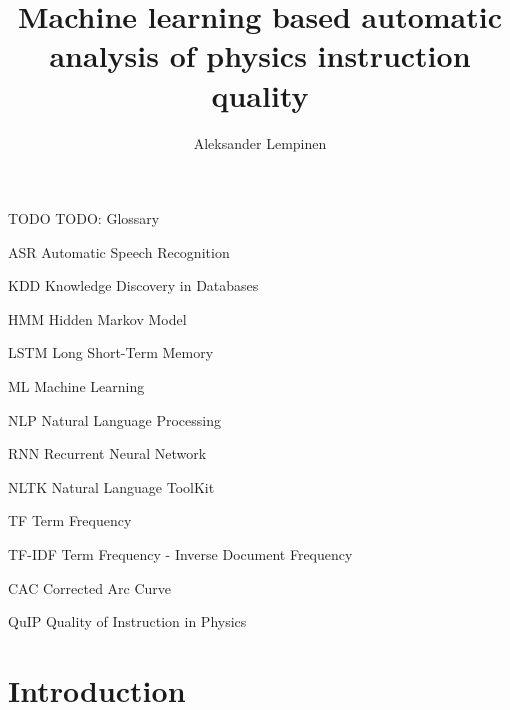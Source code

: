 \documentclass[utf8,english]{gradu3}
\begin{document}
\title{Machine learning based automatic analysis of physics instruction quality}

\author{Aleksander Lempinen}



\maketitle

\begin{thetermlist}
\item[TODO] TODO: Glossary
\item[ASR] Automatic Speech Recognition
\item[KDD] Knowledge Discovery in Databases 
\item[HMM] Hidden Markov Model
\item[LSTM] Long Short-Term Memory 
\item[ML] Machine Learning
\item[NLP] Natural Language Processing
\item[RNN] Recurrent Neural Network
\item[NLTK] Natural Language ToolKit
\item[TF] Term Frequency
\item[TF-IDF] Term Frequency - Inverse Document Frequency 
\item[CAC] Corrected Arc Curve
\item[QuIP] Quality of Instruction in Physics 
\end{thetermlist}

\mainmatter




\chapter{Introduction}
\end{document}

